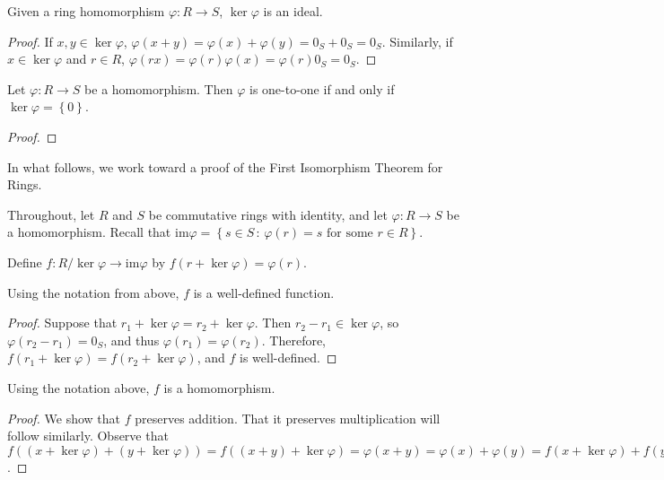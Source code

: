 \documentclass[english,course]{lecture}
\def\p{\varphi}
\def\im{\text{im}}
\theoremstyle{plain}
\def\set#1{\left\{ {#1} \right\}}
\def\setof#1#2{{\left\{#1\,\colon\,#2\right\}}}
\def\presnotes{}
\begin{document}

\begin{theorem}
	Given a ring homomorphism $\p : R\to S$, $\ker\p$ is an ideal.
\end{theorem}

\begin{proof}
	If $x,y\in \ker\p$, $\p(x+y) = \p(x) + \p(y) = 0_S + 0_S = 0_S$.
	Similarly, if $x\in \ker \p$ and $r\in R$, $\p(rx) = \p(r) \p(x) = \p(r) 0_S = 0_S$.
\end{proof}


\begin{theorem}
	Let $\p : R\to S$ be a homomorphism.
	Then $\p$ is one-to-one if and only if $\ker\p = \set{0}$.
\end{theorem}

\begin{proof}

\end{proof}


In what follows, we work toward a proof of the First Isomorphism Theorem for Rings.

Throughout, let $R$ and $S$ be commutative rings with identity, and let $\p : R\to S$ be a homomorphism.
Recall that $\im \p = \setof{s\in S}{\p(r) = s\text{ for some } r\in R}$.

Define $f: R/\ker \p \to \im \p$ by $f(r+\ker \p) = \p(r)$.

\begin{lemma}
	Using the notation from above, $f$ is a well-defined function.
\end{lemma}

\begin{proof}
Suppose that $r_1 + \ker\p = r_2 + \ker\p$.
	Then $r_2-r_1 \in \ker\p$, so $\p(r_2-r_1) = 0_S$, and thus $\p(r_1) = \p(r_2)$.
	Therefore, $f(r_1+\ker\p) = f(r_2+\ker\p)$, and $f$ is well-defined.
\end{proof}


\begin{lemma}
	Using the notation above, $f$ is a homomorphism.
\end{lemma}

\begin{proof}
We show that $f$ preserves addition. 
	That it preserves multiplication will follow similarly.
	Observe that $f((x+\ker\p) + (y+\ker\p)) = f((x+y)+\ker\p) = \p(x+y) = \p(x)+\p(y) = f(x+\ker\p) + f(y+\ker\p)$.
\end{proof}
\end{document}
